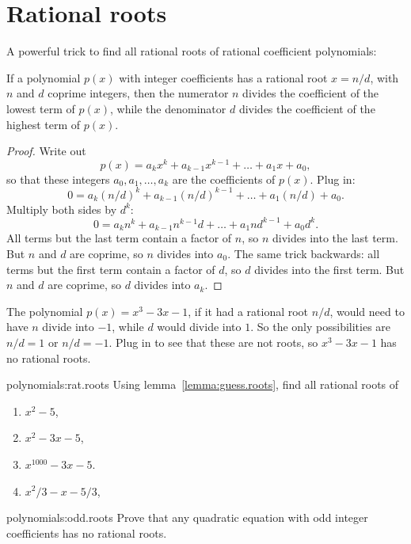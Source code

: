 \section{Rational roots}
A powerful trick to find all rational roots of rational coefficient polynomials:
\begin{lemma}\label{lemma:guess.roots}
If a polynomial \(p(x)\) with integer coefficients has a rational root \(x=n/d\), with \(n\) and \(d\) coprime integers, then the numerator \(n\) divides the coefficient of the lowest term of \(p(x)\), while the denominator \(d\) divides the coefficient of the highest term of \(p(x)\).
\end{lemma}
\begin{proof}
Write out 
\[
p(x)=a_k x^k + a_{k-1} x^{k-1} + \dots + a_1 x + a_0,
\]
so that these integers \(a_0, a_1, \dots, a_k\) are the coefficients of \(p(x)\).
Plug in:
\[
0 = a_k (n/d)^k + a_{k-1} (n/d)^{k-1} + \dots + a_1 (n/d) + a_0.
\]
Multiply both sides by \(d^k\):
\[
0 = a_k n^k + a_{k-1} n^{k-1} d  + \dots + a_1 n d^{k-1} + a_0 d^k.
\]
All terms but the last term contain a factor of \(n\), so \(n\) divides into the last term.
But \(n\) and \(d\) are coprime, so \(n\) divides into \(a_0\).
The same trick backwards: all terms but the first term contain a factor of \(d\), so \(d\) divides into the first term.
But \(n\) and \(d\) are coprime, so \(d\) divides into \(a_k\).
\end{proof}
\begin{example}\label{example:x.cubed}
The polynomial \(p(x)=x^3-3x-1\), if it had a rational root \(n/d\), would need to have \(n\) divide into \(-1\), while \(d\) would divide into \(1\).
So the only possibilities are \(n/d=1\) or \(n/d=-1\).
Plug in to see that these are not roots, so \(x^3-3x-1\) has no rational roots.
\end{example}
\begin{problem}{polynomials:rat.roots}
Using lemma~\vref{lemma:guess.roots}, find all rational roots of 
\begin{enumerate}
\item
\(x^2-5\),
\item
\(x^2-3x-5\),
\item
\(x^{1000}-3x-5\).
\item
\(x^2/3-x-5/3\),
\end{enumerate}
\end{problem}
\begin{problem}{polynomials:odd.roots}
Prove that any quadratic equation with odd integer coefficients has no rational roots.
\end{problem}

